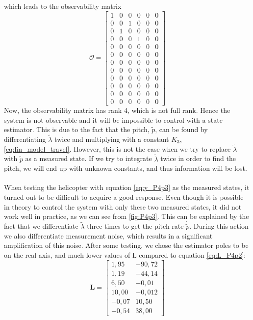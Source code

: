 which leads to the observability matrix
\begin{equation}\nonumber
    \mathcal {O}=
    {\begin{bmatrix}
        1 & 0 & 0 & 0 & 0 & 0\\
        0 & 0 & 1 & 0 & 0 & 0\\
        0 & 1 & 0 & 0 & 0 & 0\\
        0 & 0 & 0 & 1 & 0 & 0\\
        0 & 0 & 0 & 0 & 0 & 0\\
        0 & 0 & 0 & 0 & 0 & 0\\
        0 & 0 & 0 & 0 & 0 & 0\\
        0 & 0 & 0 & 0 & 0 & 0\\
        0 & 0 & 0 & 0 & 0 & 0\\
        0 & 0 & 0 & 0 & 0 & 0\\
        0 & 0 & 0 & 0 & 0 & 0\\
        0 & 0 & 0 & 0 & 0 & 0
    \end{bmatrix}}
\end{equation}
Now, the observability matrix has rank 4, which is not full rank. Hence the system is not observable and it will be impossible to control with a state estimator. This is due to the fact that the pitch, $\tilde{p}$, can be found by differentiating $\tilde{\lambda}$ twice and multiplying with a constant $K_3$, \eqref{eq:lin_model_travel}. However, this is not the case when we try to replace $\tilde{\lambda}$ with $\tilde{p}$ as a measured state. If we try to integrate $\tilde{\lambda}$ twice in order to find the pitch, we will end up with unknown constants, and thus information will be lost.\\
\\
When testing the helicopter with equation \eqref{eq:y_P4p3} as the measured states, it turned out to be difficult to acquire a good response. Even though it is possible in theory to control the system with only these two measured states, it did not work well in practice, as we can see from \cref{fig:P4p3}. This can be explained by the fact that we differentiate $\tilde{\lambda}$ three times to get the pitch rate $\dot{\tilde{p}}$. During this action we also differentiate measurement noise, which results in a significant amplification of this noise. After some testing, we chose the estimator poles to be on the real axis, and much lower values of L compared to equation \eqref{eq:L_P4p2}:
\begin{equation}\nonumber
\mathbf{L} = \begin{bmatrix}
1,95 & -90,72\\
1,19 & -44,14\\
6,50 & -0,01\\
10,00 &	-0,012\\
-0,07 &	10,50\\
-0,54 &	38,00
\end{bmatrix}
\end{equation}
